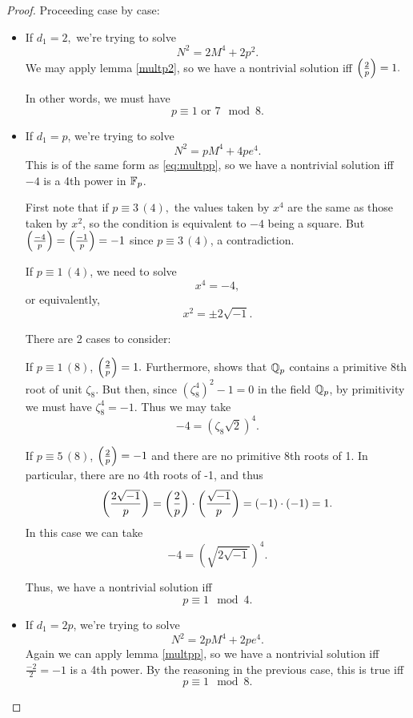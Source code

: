 \documentclass[12pt, a4paper]{report}
\begin{document}
\begin{proof} Proceeding case by case:
  \begin{itemize}

   
  \item If $d_1 = 2,$ we're trying to solve
    \[N^2 = 2M^4 + 2p^2.\]
    We may apply lemma \autoref{multp2}, so we have a nontrivial solution
    iff $\left(\frac{2}{p}\right) = 1.$
    
    In other words, we must have
    \[p \equiv 1 \text{ or } 7 \mod{8}.\]
      
  \item If $d_1 = p$, we're trying to solve
    \[N^2 = pM^4 + 4pe^4.\]
    This is of the same form as \autoref{eq:multpp}, so we have a nontrivial
    solution iff $-4$ is a 4th power in $\mathbb{F}_p$.

    First note that if
    $p \equiv 3 \,(4),$ the values taken by $x^4$ are the same as those taken
    by $x^2$, so the condition is equivalent to $-4$ being a square.
    But $\left(\frac{-4}{p}\right) = \left(\frac{-1}{p}\right) = -1$ since $p \equiv 3 \, (4)$,
    a contradiction.

    If $p \equiv 1 \,(4)$, we need to solve
    \[x^4 = -4,\]
    or equivalently,
    \[x^2 = \pm 2\sqrt{-1}.\]

    There are 2 cases to consider:

    If $p \equiv 1 \, (8)$, $\left(\frac{2}{p}\right) = 1.$ Furthermore,
    \cite[page 4, Theorem 3.1]{Hensel} shows that
    ${\mathbb Q}_p$ contains a primitive 8th root of unit $\zeta_8$. But then, since
    $(\zeta_8^4)^2 - 1 = 0$ in the field ${\mathbb Q}_p$, by primitivity we must have
    $\zeta_8^4 = -1$. Thus we may take
    \[-4 = (\zeta_8\sqrt{2})^4.\]

    If $p \equiv 5 \, (8)$, $\left(\frac{2}{p}\right) = -1$ and there are no primitive
    8th roots of 1. In particular, there are no 4th roots of -1, and thus
    \[\left(\frac{2\sqrt{-1}}{p}\right) = \left(\frac{2}{p}\right) \cdot \left(\frac{\sqrt{-1}}{p}\right) =
      (-1)\cdot(-1) = 1.\]
    In this case we can take
    \[-4 = \left(\sqrt{2\sqrt{-1}}\right)^4.\]

    Thus, we have a nontrivial solution iff
    \[p \equiv 1 \mod{4}.\]


  \item If $d_1 = 2p$, we're trying to solve
    \[N^2 = 2pM^4 + 2pe^4.\]
    Again we can apply lemma \ref{multpp}, so we have a nontrivial solution iff
    $\frac{-2}{2} = -1$ is a 4th power. By the reasoning in the previous case,
    this is true iff
    \[p \equiv 1 \mod{8}.\]


\end{itemize}
\end{proof}
\end{document}

